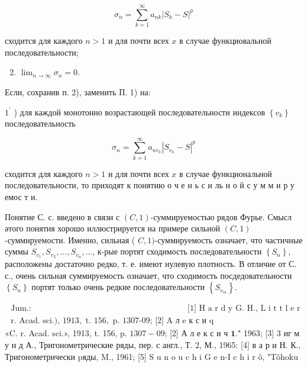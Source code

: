 \documentclass[10pt]{article}
\begin{document}
\[

\sigma_{n}=\sum_{k=1}^{\infty} a_{n k}\left|S_{k}-S\right|^{p}

\]



сходится для каждого $n>1$ и для почти всех $x$ в случае функциовальной последовательности;



\begin{enumerate}

  \setcounter{enumi}{1}

  \item $\lim _{n \rightarrow \infty} \sigma_{n}=0$.

\end{enumerate}



Если, сохранив п. 2), заменить П. 1) на:



$1^{\prime}$ ) для каждой монотонно возрастающей последовательности индексов $\left\{v_{k}\right\}$ последовательность



\[

\sigma_{n}=\sum_{k=1}^{\infty} a_{n v_{k}}\left|S_{v_{k}}-S\right|^{p}

\]



сходится для каждого $n>1$ и для почти всех $x$ в случае функциональной последовательности, то приходят к понятию о ч е н ь с и ль н о й с у м м и р у емос т и.



Понятие С. с. введено в связи с $(C, 1)$-суммируемостью рядов Фурье. Смысл әтого понятия хорошо иллюстрируется на примере сильной $(C, 1)$-суммируемости. Именно, сильная ( $C, 1)$-суммируемость означает, что частичные суммы $S_{v_{1}}, S_{v_{2}}, \ldots, S_{v_{n}}, \ldots$, к-рые портят сходимость последовательности $\left\{S_{n}\right\}$, расположены достаточно редко, т. е. имеют нулевую плотность. В отличие от С. с., очень сильная суммируемость означает, что сходимость посдедовательности $\left\{S_{n}\right\}$ портят только очень редкие последовательности $\left\{S_{v_{m}}\right\}$.



$\begin{array}{llll}\text { Jum.: } & \text { [1] H a r d y G. H., L i t t l e r v o o d J. J., } \\ \text { r. Acad. sci.), } 1913, \text { t. } 156, \text { p. 1307-09; [2] A л e к с и q }\end{array}$ «C. r. Acad. sci.», 1913, t. 156, p. $1307-09$; [2] А л е к с и ч $\mathbf{1}$." 1963; [3] 3 иг м у н д А., Тригонометрические ряды, пер. с англ., Т. 2, М., 1965: [4] в а р и Н. К., Тригонометрически pяды, M., 1961; [5] S u n o u c h i G e n-I c h i r ô, "Tôhoku
\end{document}
